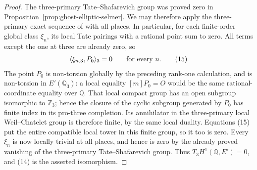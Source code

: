 \begin{proof}
The three-primary Tate--Shafarevich group was proved
zero in Proposition~\ref{prop:ghost-elliptic-selmer}.
We may therefore apply the three-primary exact
sequence of \cite[I.6.26(b)]{GhostMilneADT} with
all places. In particular, for each finite-order
global class \(\xi_n\), its local Tate pairings
with a rational point sum to zero. All terms
except the one at three are already zero, so
\[
                   \langle\xi_{n,3},P_0\rangle_3=0
                   \qquad\hbox{for every }n.          \tag{15}
\]
The point \(P_0\) is non-torsion globally by the
preceding rank-one calculation, and is non-torsion
in \(E'(\mathbb Q_3)\): a local equality
\([m]P_0=O\) would be the same rational-coordinate
equality over \(\mathbb Q\). That local compact
group has an open subgroup isomorphic to
\(\mathbb Z_3\); hence the closure of the cyclic
subgroup generated by \(P_0\) has finite index
in its pro-three completion. Its annihilator in
the three-primary local Weil--Chatelet group is
therefore finite, by the same local duality.
Equations (15) put the entire compatible local
tower in this finite group, so it too is zero.
Every \(\xi_n\) is now locally trivial at all
places, and hence is zero by the already proved
vanishing of the three-primary Tate--Shafarevich
group. Thus \(T_3H^1(\mathbb Q,E')=0\), and (14)
is the asserted isomorphism.
\end{proof}

